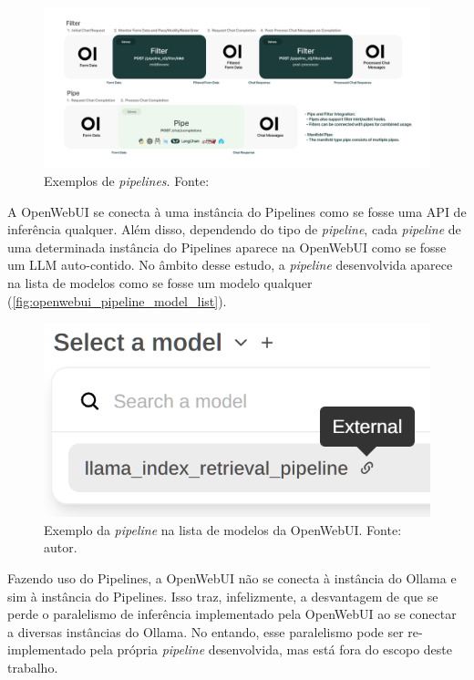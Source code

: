 \documentclass[journal]{IEEEtran}
\begin{document}
\begin{figure}[h]
    \centering
    \includegraphics[width=\textwidth,clip,trim=40 40 40 40]{media/openwebui_pipelines_workflow.png}
    \caption{Exemplos de \textit{pipelines}. Fonte:~\cite{openwebui}\label{fig:rag_pipeline}}
\end{figure}

A OpenWebUI se conecta à uma instância do Pipelines como se fosse uma API de inferência qualquer.
Além disso, dependendo do tipo de \textit{pipeline}, cada \textit{pipeline} de uma determinada instância do Pipelines aparece na OpenWebUI como se fosse um LLM auto-contido.
No âmbito desse estudo, a \textit{pipeline} desenvolvida aparece na lista de modelos como se fosse um modelo qualquer (\autoref{fig:openwebui_pipeline_model_list}).

\begin{figure}[h]
    \centering
    \includegraphics[width=\columnwidth]{media/openwebui_pipeline_model_list.png}
    \caption{Exemplo da \textit{pipeline} na lista de modelos da OpenWebUI\@. Fonte: autor.\label{fig:openwebui_pipeline_model_list}}
\end{figure}

Fazendo uso do Pipelines, a OpenWebUI não se conecta à instância do Ollama e sim à instância do Pipelines.
Isso traz, infelizmente, a desvantagem de que se perde o paralelismo de inferência implementado pela OpenWebUI ao se conectar a diversas instâncias do Ollama.
No entando, esse paralelismo pode ser re-implementado pela própria \textit{pipeline} desenvolvida, mas está fora do escopo deste trabalho.
\end{document}
